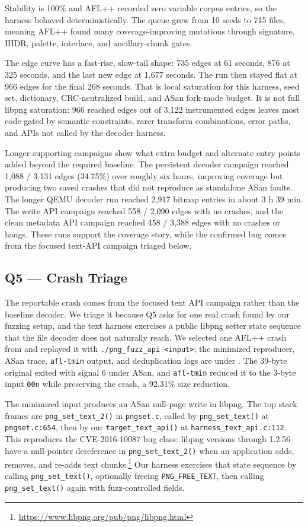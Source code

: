 \documentclass[letterpaper,twocolumn,10pt]{article}
\begin{document}
Stability is 100\% and AFL++ recorded zero variable corpus entries, so the
harness behaved deterministically. The queue grew from 10 seeds to 715 files,
meaning AFL++ found many coverage-improving mutations through signature, IHDR,
palette, interlace, and ancillary-chunk gates.

The edge curve has a fast-rise, slow-tail shape: 735 edges at 61 seconds, 876
at 325 seconds, and the last new edge at 1{,}677 seconds. The run then stayed
flat at 966 edges for the final 268 seconds. That is local saturation for this
harness, seed set, dictionary, CRC-neutralized build, and ASan fork-mode budget.
It is not full libpng saturation: 966 reached edges out of 3{,}122 instrumented
edges leaves most code gated by semantic constraints, rarer transform
combinations, error paths, and APIs not called by the decoder harness.

Longer supporting campaigns show what extra budget and alternate entry points
added beyond the required baseline. The persistent decoder campaign reached
1{,}088 / 3{,}131 edges (34.75\%) over roughly six hours, improving coverage
but producing two saved crashes that did not reproduce as standalone ASan
faults. The longer QEMU decoder run reached 2{,}917 bitmap entries in about
3 h 39 min. The write API campaign reached 558 / 2{,}090 edges with no crashes,
and the clean metadata API campaign reached 458 / 3{,}388 edges with no crashes
or hangs. These runs support the coverage story, while the confirmed bug comes
from the focused text-API campaign triaged below.

\subsection{Q5 --- Crash Triage}
The reportable crash comes from the focused text API campaign rather than the
baseline decoder. We triage it because Q5 asks for one real crash found by our
fuzzing setup, and the text harness exercises a public libpng setter state
sequence that the file decoder does not naturally reach. We selected one AFL++
crash from
 and
replayed it with \texttt{./png\_fuzz\_api <input>}; the minimized reproducer,
ASan trace, \texttt{afl-tmin} output, and deduplication logs are under
. The 39-byte original exited with signal 6 under
ASan, and \texttt{afl-tmin} reduced it to the 3-byte input \texttt{00n} while
preserving the crash, a 92.31\% size reduction.

The minimized input produces an ASan null-page write in libpng. The top stack
frames are \texttt{png\_set\_text\_2()} in \texttt{pngset.c}, called by
\texttt{png\_set\_text()} at \texttt{pngset.c:654}, then by our
\texttt{target\_text\_api()} at \texttt{harness\_text\_api.c:112}. This
reproduces the CVE-2016-10087 bug class: libpng versions through 1.2.56 have a
null-pointer dereference in \texttt{png\_set\_text\_2()} when an application
adds, removes, and re-adds text chunks.\footnote{\url{https://www.libpng.org/pub/png/libpng.html}}
Our harness exercises that state sequence by calling \texttt{png\_set\_text()},
optionally freeing \texttt{PNG\_FREE\_TEXT}, then calling \texttt{png\_set\_text()}
again with fuzz-controlled fields.
\end{document}
